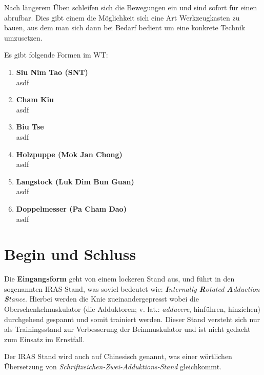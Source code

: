 Nach l\"angerem \"Uben schleifen sich die Bewegungen ein und sind sofort f\"ur einen abrufbar. Dies gibt einem die M\"oglichkeit sich eine Art Werkzeugkasten zu bauen, aus dem man sich dann bei Bedarf bedient um eine konkrete Technik umzusetzen.



\begin{flushleft}
	Es gibt folgende Formen im WT:
\end{flushleft}

\begin{enumerate}
	\item \textbf{Siu Nim Tao (SNT)} \\ asdf
	\item \textbf{Cham Kiu} \\ asdf
	\item \textbf{Biu Tse} \\ asdf
	\item \textbf{Holzpuppe (Mok Jan Chong)} \\ asdf
	\item \textbf{Langstock (Luk Dim Bun Guan)} \\ asdf
	\item \textbf{Doppelmesser (Pa Cham Dao)} \\ asdf
\end{enumerate}

\newpage


\section*{Begin und Schluss}

Die \textbf{Eingangsform} geht von einem lockeren Stand aus, und f\"uhrt in den sogenannten IRAS-Stand, was soviel bedeutet wie: \textit{\textbf{I}nternally \textbf{R}otated \textbf{A}dduction \textbf{S}tance}. Hierbei werden die Knie zueinandergepresst wobei die Oberschenkelmuskulator (die Adduktoren; v. lat.: \textit{adducere}, hinf\"uhren, hinziehen) durchgehend gespannt und somit trainiert werden. Dieser Stand versteht sich nur als Trainingsstand zur Verbesserung der Beinmuskulator und ist nicht gedacht zum Einsatz im Ernstfall.

\begin{WTCommonBegriff}
	Der IRAS Stand wird auch auf Chinesisch  genannt, was einer w\"ortlichen \"Ubersetzung von \textit{Schriftzeichen-Zwei-Adduktions-Stand} gleichkommt.
\end{WTCommonBegriff}
	

